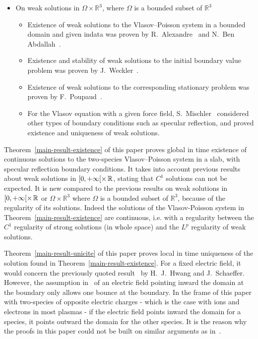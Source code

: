 \documentclass[AHL,Unicode,longabstracts,published]{cedram}
\newcommand{\R}{\mathbb{R}}
\begin{document}
\begin{itemize}
\begin{itemize}
\end{itemize}
\vspace{4pt}
\item On weak solutions in $\Omega \times \R ^3$, where $\Omega $ is a bounded subset of $\R ^3$
\begin{itemize}
\item[-] Existence of weak solutions to the Vlasov--Poisson system in a bounded domain and given indata was proven by R.~Alexandre~\cite{Ale93} and N.~Ben Abdallah~\cite{Ben94}.
\item[-] Existence and stability of weak solutions to the initial boundary value problem was proven by J.~Weckler~\cite{Wec95}.
\item[-] Existence of weak solutions to the corresponding stationary problem was proven by F.~Poupaud~\cite{Pou90}.
\item[-] For the Vlasov equation with a given force field, S.~Mischler~\cite{Mis99} considered other types of boundary conditions such as specular reflection, and proved existence and uniqueness of weak solutions.
\end{itemize}
\end{itemize}


Theorem~\ref{main-result-existence} of this paper proves global in time existence of continuous solutions to the two-species Vlasov--Poisson system in a slab, with specular reflection boundary conditions. It takes into account previous results~\cite{Guo95} about weak solutions in $[0,+\infty [
\times \hspace*{0.02in}\R $, stating that $C^1$ solutions can not be expected. It is new compared to the previous results on weak solutions in $[0,+\infty [\times \hspace*{0.02in}\R $ or $\Omega \times \R ^3$ where $\Omega $ is a bounded subset of $\R ^3$, because of the regularity of its solutions. Indeed the solutions of the Vlasov-Poisson system in Theorem~\ref{main-result-existence} are continuous, i.e. with a regularity between the $C^1$ regularity of strong solutions (in whole space) and the $L^p$ regularity of weak solutions. 


Theorem~\ref{main-result-unicite} of this paper proves local in time uniqueness of the solution found in Theorem~\ref{main-result-existence}. For a fixed electric field, it would concern the previously quoted result~\cite{HS08} by H.~J.~Hwang and J.~Schaeffer. However, the assumption in~\cite{HS08} of an electric field pointing inward the domain at the boundary only allows one bounce at the boundary. In the frame of this paper with two-species of opposite electric charges - which is the case with ions and electrons in most plasmas - if the electric field points inward the domain for a species, it points outward the domain for the other species. It is the reason why the proofs in this paper could not be built on similar arguments as in~\cite{HS08}.
\end{document}
